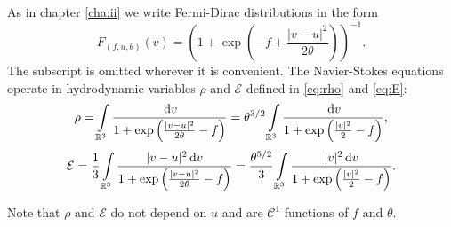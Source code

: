 As in chapter \ref{cha:ii} we 
 write Fermi-Dirac distributions in the form
\begin{equation*}%
F_{(f,u,\theta)}(v) =
\left(1+\exp\left(-f+\frac{|v-u|^2}{2\theta}\right)\right)^{
-1}.\end{equation*}%
The subscript is omitted wherever it is convenient.
The Navier-Stokes equations operate in hydrodynamic variables  $\rho$ and $\mathcal E$ defined in \eqref{eq:rho} and \eqref{eq:E}:
\begin{equation*}
\rho = \int\limits_{\mathbb R^3} \frac{{\,\mathrm{d} v}}{1+\exp\left(\frac{|v-u|^2}{2\theta}-f\right)} =  \theta^{3/2}\int\limits_{\mathbb R^3} \frac{{\,\mathrm{d} v}}{1+\exp\left(\frac{|v|^2}{2}-f\right)},
 \end{equation*}
\begin{equation*}%
\mathcal E = \frac 13\int\limits_{\mathbb R^3} \frac{|v-u|^2\dv}{1+\exp\left(\frac{|v-u|^2}{2\theta}-f\right)} = \frac {\theta^{5/2}}{3}\int\limits_{\mathbb R^3} \frac{|v |^2\dv}{1+\exp\left(\frac{|v |^2}{2 }-f\right)}.
\end{equation*}

Note that $\rho$ and $\mathcal E$ do not depend on $u$ and are $\mathcal C^1$ functions of $f$ and $\theta$.



